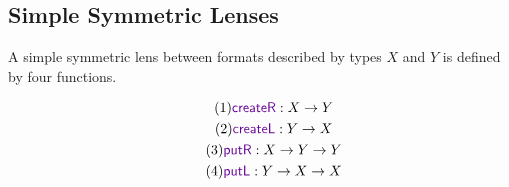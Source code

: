 \documentclass[acmsmall,screen,anonymous]{acmart}
\begin{document}
%

\subsection{Simple Symmetric Lenses}
A simple symmetric lens between formats described by types $X$ and $Y$ is
defined by four functions. 


\begin{gather}
 \tag{1}
 \mbox{$\CreateR \OfType X \rightarrow Y$}\\
 \tag{2}
 \mbox{$\CreateL \OfType Y \rightarrow X$}\\
 \tag{3}
 \mbox{$\PutR \OfType X \rightarrow Y \rightarrow Y$}\\
 \tag{4}
 \mbox{$\PutL \OfType Y \rightarrow X \rightarrow X$}
\end{gather}
\end{document}
